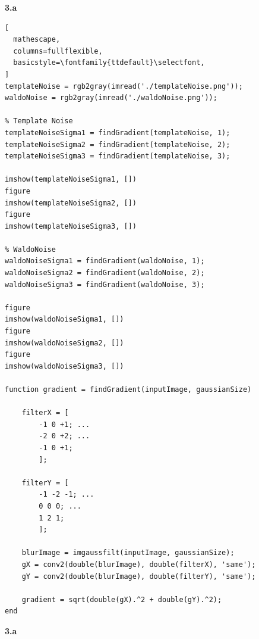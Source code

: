 \documentclass[11pt]{article}
\begin{document}
\newpage
\noindent
\textbf{3.a} 
\begin{lstlisting}[
  mathescape,
  columns=fullflexible,
  basicstyle=\fontfamily{ttdefault}\selectfont,
]
templateNoise = rgb2gray(imread('./templateNoise.png'));
waldoNoise = rgb2gray(imread('./waldoNoise.png'));

% Template Noise
templateNoiseSigma1 = findGradient(templateNoise, 1);
templateNoiseSigma2 = findGradient(templateNoise, 2);
templateNoiseSigma3 = findGradient(templateNoise, 3);

imshow(templateNoiseSigma1, [])
figure
imshow(templateNoiseSigma2, [])
figure
imshow(templateNoiseSigma3, [])

% WaldoNoise
waldoNoiseSigma1 = findGradient(waldoNoise, 1);
waldoNoiseSigma2 = findGradient(waldoNoise, 2);
waldoNoiseSigma3 = findGradient(waldoNoise, 3);

figure
imshow(waldoNoiseSigma1, [])
figure
imshow(waldoNoiseSigma2, [])
figure
imshow(waldoNoiseSigma3, [])

function gradient = findGradient(inputImage, gaussianSize) 

    filterX = [
        -1 0 +1; ...
        -2 0 +2; ...
        -1 0 +1;
        ];

    filterY = [
        -1 -2 -1; ...
        0 0 0; ...
        1 2 1;
        ];

    blurImage = imgaussfilt(inputImage, gaussianSize);
    gX = conv2(double(blurImage), double(filterX), 'same');
    gY = conv2(double(blurImage), double(filterY), 'same');

    gradient = sqrt(double(gX).^2 + double(gY).^2);
end
\end{lstlisting}
\noindent
\textbf{3.a} 
\end{document}
